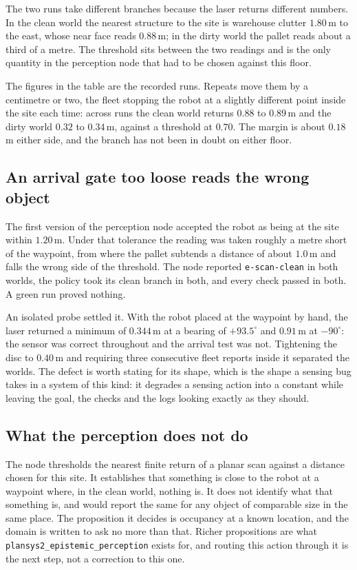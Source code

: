 \documentclass[11pt,a4paper]{article}
\theoremstyle{definition}
\newcommand{\code}[1]{\texttt{\small #1}}
\begin{document}
The two runs take different branches because the laser returns different
numbers. In the clean world the nearest structure to the site is warehouse
clutter $1.80$\,m to the east, whose near face reads $0.88$\,m; in the dirty
world the pallet reads about a third of a metre. The threshold sits between the
two readings and is the only quantity in the perception node that had to be
chosen against this floor.

The figures in the table are the recorded runs. Repeats move them by a
centimetre or two, the fleet stopping the robot at a slightly different point
inside the site each time: across runs the clean world returns $0.88$ to
$0.89$\,m and the dirty world $0.32$ to $0.34$\,m, against a threshold at
$0.70$. The margin is about $0.18$\,m either side, and the branch has not been
in doubt on either floor.

\subsection{An arrival gate too loose reads the wrong object}

The first version of the perception node accepted the robot as being at the site
within $1.20$\,m. Under that tolerance the reading was taken roughly a metre
short of the waypoint, from where the pallet subtends a distance of about
$1.0$\,m and falls the wrong side of the threshold. The node reported
\code{e-scan-clean} in both worlds, the policy took its clean branch in both, and
every check passed in both. A green run proved nothing.

An isolated probe settled it. With the robot placed at the waypoint by hand, the
laser returned a minimum of $0.344$\,m at a bearing of $+93.5^{\circ}$ and
$0.91$\,m at $-90^{\circ}$: the sensor was correct throughout and the arrival
test was not. Tightening the disc to $0.40$\,m and requiring three consecutive
fleet reports inside it separated the worlds. The defect is worth stating for its
shape, which is the shape a sensing bug takes in a system of this kind: it
degrades a sensing action into a constant while leaving the goal, the checks and
the logs looking exactly as they should.

\subsection{What the perception does not do}

The node thresholds the nearest finite return of a planar scan against a distance
chosen for this site. It establishes that something is close to the robot at a
waypoint where, in the clean world, nothing is. It does not identify what that
something is, and would report the same for any object of comparable size in the
same place. The proposition it decides is occupancy at a known location, and the
domain is written to ask no more than that. Richer propositions are what
\code{plansys2\_epistemic\_perception} exists for, and routing this action
through it is the next step, not a correction to this one.
\end{document}

